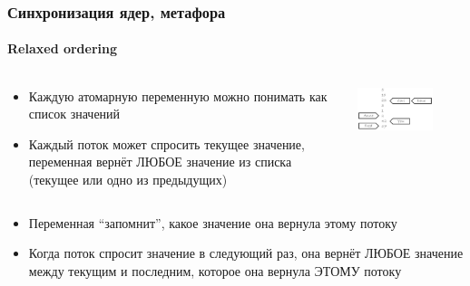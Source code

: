 \documentclass[xetex,mathserif,serif]{beamer}
\begin{document}
    \begin{frame}
        \frametitle{Синхронизация ядер, метафора}
        \framesubtitle{Relaxed ordering}
        \begin{columns}
            \begin{column}{0.6\textwidth}
                \begin{itemize}
                    \item Каждую атомарную переменную можно понимать как список значений
                    \item Каждый поток может спросить текущее значение, переменная вернёт ЛЮБОЕ значение из списка (текущее или одно из предыдущих)
                \end{itemize}
            \end{column}
            \begin{column}{0.4\textwidth}
                \begin{center}
                    \includegraphics[width=0.7\textwidth]{relaxedOrdering.png}
                \end{center}
            \end{column}
        \end{columns}
        \begin{itemize}
            \item Переменная ``запомнит'', какое значение она вернула этому потоку
            \item Когда поток спросит значение в следующий раз, она вернёт ЛЮБОЕ значение между текущим и последним, которое она вернула ЭТОМУ потоку
        \end{itemize}
    \end{frame}
\end{document}
